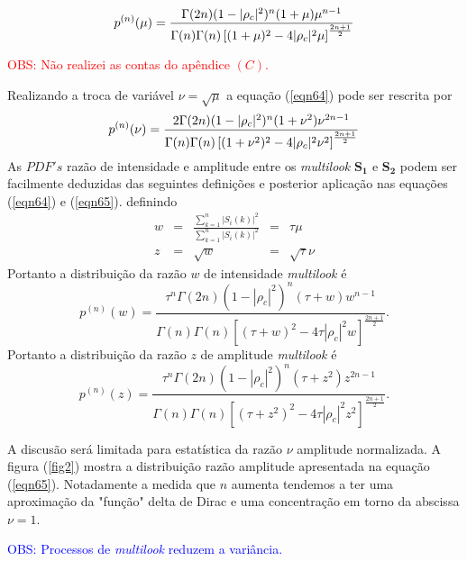 \begin{equation}\label{eqn64}
	p^{(n)}(\mu)=\frac{\Gamma(2n)(1-|\rho_c|^2)^{n}(1+\mu)\mu^{n-1}}{\Gamma(n)\Gamma(n)\left[(1+\mu)^2-4|\rho_c|^2\mu \right]^{\frac{2n+1}{2}}}\\
\end{equation}

\textcolor{red}{OBS: Não realizei as contas do apêndice $(C)$.}

Realizando a troca de variável $\nu=\sqrt{\mu}$ a equação (\ref{eqn64}) pode ser rescrita por
\begin{equation}\label{eqn65}
	p^{(n)}(\nu)=\frac{2\Gamma(2n)(1-|\rho_c|^2)^{n}(1+\nu^2)\nu^{2n-1}}{\Gamma(n)\Gamma(n)\left[(1+\nu^2)^2-4|\rho_c|^2\nu^2 \right]^{\frac{2n+1}{2}}}\\
\end{equation}
As $PDF's$ razão de intensidade e amplitude entre os {\it multilook} $\mathbf{S_1}$ e $\mathbf{S_2}$ podem ser facilmente deduzidas das seguintes definições e posterior aplicação nas equações (\ref{eqn64}) e (\ref{eqn65}). definindo 
\begin{equation}\label{eqn66}
\begin{array}{ccccc}
	w&=&\frac{\sum_{k=1}^{n}|S_i(k)|^2}{\sum_{k=1}^{n}|S_i(k)|^2}&=&\tau\mu\\
	z&=&\sqrt{w}&=&\sqrt{\tau}\nu
\end{array}
\end{equation}
Portanto a distribuição da razão $w$ de intensidade {\it multilook} é
\begin{equation}\label{eqn67}
	p^{(n)}(w)=\frac{\tau^{n}\Gamma(2n)(1-|\rho_c|^2)^{n}(\tau+w)w^{n-1}}{\Gamma(n)\Gamma(n)\left[(\tau+w)^2-4\tau|\rho_c|^2w \right]^{\frac{2n+1}{2}}}.
\end{equation}
Portanto a distribuição da razão $z$ de amplitude {\it multilook} é
\begin{equation}\label{eqn68}
	p^{(n)}(z)=\frac{\tau^{n}\Gamma(2n)(1-|\rho_c|^2)^{n}(\tau+z^2)z^{2n-1}}{\Gamma(n)\Gamma(n)\left[(\tau+z^2)^2-4\tau|\rho_c|^2z^2 \right]^{\frac{2n+1}{2}}}.
\end{equation}

A discusão será limitada para estatística da razão $\nu$ amplitude normalizada. A figura (\ref{fig2}) mostra a distribuição razão amplitude apresentada na equação  (\ref{eqn65}). Notadamente a medida que $n$ aumenta tendemos a ter uma aproximação da "função" delta de Dirac e uma concentração em torno da abscissa $\nu=1$.

\textcolor{blue}{OBS: Processos de {\it multilook} reduzem a variância.}

